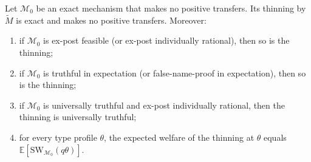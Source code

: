 \documentclass[format=acmsmall, review=false]{acmart}
\newcommand{\E}{\mathbb{E}}
\newcommand{\SW}{\mathrm{SW}}
\theoremstyle{acmdefinition}%
\begin{document}
\begin{proposition}
\label{prop:thinning}
Let \(\mathcal M_0\) be an exact mechanism that makes no positive
transfers. Its thinning by \(\widetilde M\) is exact and makes no
positive transfers. Moreover:
\begin{enumerate}
\item[(a)] if \(\mathcal M_0\) is ex-post feasible (or ex-post
individually rational), then so is the thinning;
\item[(b)] if \(\mathcal M_0\) is truthful in expectation (or
false-name-proof in expectation), then so is the thinning;
\item[(c)] if \(\mathcal M_0\) is universally truthful and ex-post
individually rational, then the thinning is universally truthful;
\item[(d)] for every type profile \(\theta\), the expected welfare
of the thinning at \(\theta\) equals
\(\E[\SW_{\mathcal M_0}(q\theta)]\).
\end{enumerate}
\end{proposition}
\end{document}
